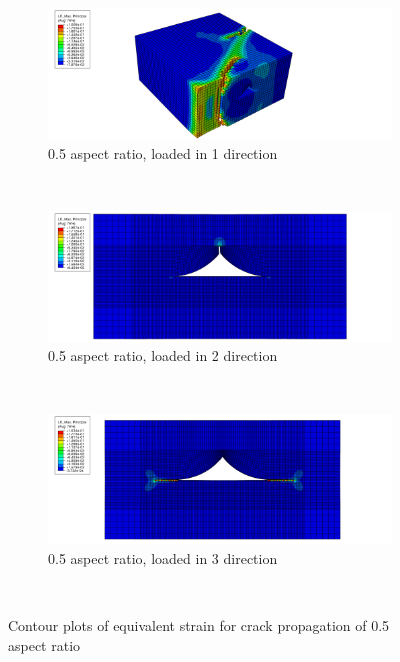 \begin{figure}
\centering
  \begin{subfigure}[b]{1\textwidth}
    \includegraphics[width=\textwidth]{appendix_b/figures/p1_05crack.png}
    \caption{0.5 aspect ratio, loaded in 1 direction}
  \end{subfigure}
  \\
  \begin{subfigure}[b]{0.6\textwidth}
    \includegraphics[width=\textwidth]{appendix_b/figures/p2_05crack.png}
    \caption{0.5 aspect ratio, loaded in 2 direction}
  \end{subfigure}
  \\
    \begin{subfigure}[b]{0.60\textwidth}
    \includegraphics[width=\textwidth]{appendix_b/figures/p3_05crack.png}
    \caption{0.5 aspect ratio, loaded in 3 direction}
  \end{subfigure}
  \\
    \caption{Contour plots of equivalent strain for crack propagation of 0.5 aspect ratio}
  \label{fig:Contourplot}
  \end{figure}


